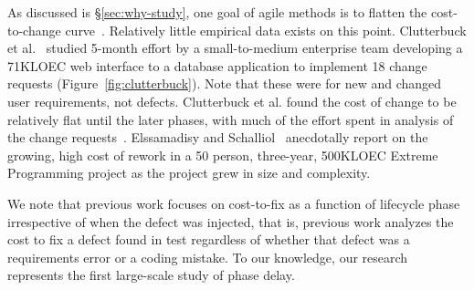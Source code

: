 As discussed is \S\ref{sec:why-study}, one goal of agile methods is to flatten the cost-to-change curve~\cite{beck00}. Relatively little empirical data exists on this point. Clutterbuck et al.~\cite{Clutterbuck09} studied 5-month effort by a small-to-medium enterprise team developing a 71KLOEC web interface to a database application to implement 18 change requests (Figure~\ref{fig:clutterbuck}). Note that these were for new and changed user requirements, not defects. Clutterbuck et al. found the cost of change to be relatively flat until the later phases, with much of the effort spent in analysis of the change requests~\cite{Clutterbuck09}. Elssamadisy and Schalliol~\cite{Elssamadisy02} anecdotally report on the growing, high cost of rework in a 50 person, three-year, 500KLOEC Extreme Programming project as the project grew in size and complexity.

 
 We note that previous work focuses on cost-to-fix as a function of lifecycle phase irrespective of when the defect was injected, that is, previous work analyzes the cost to fix a defect found in test regardless of whether that defect was a requirements error or a coding mistake. To our knowledge, our research represents the first large-scale study of phase delay.

